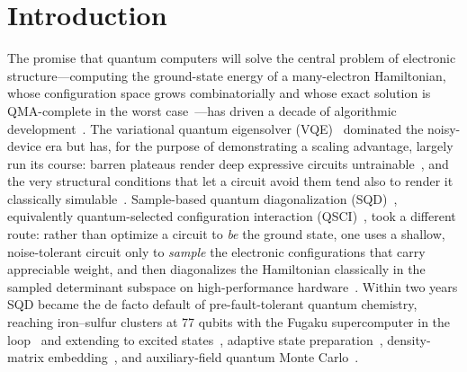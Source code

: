 \section{Introduction}

The promise that quantum computers will solve the central problem of electronic
structure---computing the ground-state energy of a many-electron Hamiltonian, whose
configuration space grows combinatorially and whose exact solution is QMA-complete in the worst
case~\cite{schuchverstraete2009}---has driven a decade of algorithmic development~\cite{reiher2017,cerezo2021,tilly2022}. The
variational quantum eigensolver (VQE)~\cite{peruzzo2014,kandala2017} dominated the noisy-device era
but has, for the purpose of demonstrating a scaling advantage, largely run its course: barren
plateaus render deep expressive circuits untrainable~\cite{mcclean2018}, and the very structural
conditions that let a circuit avoid them tend also to render it classically
simulable~\cite{cerezo2025bp}. Sample-based quantum diagonalization
(SQD)~\cite{robledomoreno2025}, equivalently quantum-selected configuration interaction
(QSCI)~\cite{kanno2023}, took a different route: rather than optimize a circuit to \emph{be} the ground state, one uses a
shallow, noise-tolerant circuit only to \emph{sample} the electronic configurations that carry
appreciable weight, and then diagonalizes the Hamiltonian classically in the sampled determinant
subspace on high-performance hardware~\cite{robledomoreno2025,skqd2025,yoshioka2025,kirby2023}.
Within two years SQD became the de facto default of pre-fault-tolerant quantum chemistry, reaching
iron--sulfur clusters at 77 qubits with the Fugaku supercomputer in the
loop~\cite{robledomoreno2025,shirakawa2025} and extending to excited
states~\cite{extsqd2025}, adaptive state preparation~\cite{adaptqsci}, density-matrix
embedding~\cite{shajan2024}, and auxiliary-field quantum Monte Carlo~\cite{danilov2025,qcqmc,qcafqmcion2025}.


